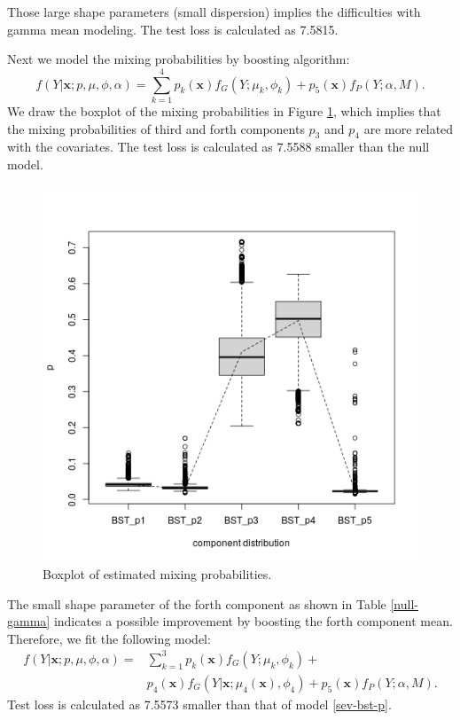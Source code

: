 \documentclass[11pt]{article}
\numberwithin{equation}{section}
\def\bx{\boldsymbol{x}}
\begin{document}
	Those large shape parameters (small dispersion) implies the  difficulties with {gamma mean modeling}. The test loss is calculated as 7.5815.

Next we model the mixing probabilities by boosting algorithm:
\begin{equation}\label{sev-bst-p}
f(Y|\bx;p,\mu,\phi,\alpha)=\sum_{k=1}^4p_k(\bx)f_{G}(Y;\mu_k,\phi_k)+p_5(\bx)f_{P}(Y;\alpha,M).
\end{equation}
We draw the boxplot of the mixing probabilities in Figure \ref{bx-bst-p}, which implies that the mixing probabilities of third and forth components $p_3$ and $p_4$ are more related with the covariates.
The test loss is calculated as 7.5588 smaller than the null model.
	\begin{figure}[htp!]
		\centering
		\includegraphics[width=0.35\linewidth]{../plots/sev/bst_p}
		\caption{Boxplot of estimated mixing probabilities.}\label{bx-bst-p}
	\end{figure}


The small shape parameter of the forth component as shown in Table \ref{null-gamma} indicates a possible improvement by boosting the forth component  mean.
Therefore, we fit the following model:
	$$
	\begin{aligned}
		f(Y|\bx;p,\mu,\phi,\alpha)=&\sum_{k=1}^3p_k(\bx)f_{G}(Y;\mu_k,\phi_k)+ \\
		&p_4(\bx)f_{G}(Y|\bx;\mu_4(\bx),\phi_4)+ p_5(\bx)f_{P}(Y;\alpha,M).
	\end{aligned}
	$$
	Test loss is calculated as 7.5573 smaller than that of model \eqref{sev-bst-p}. 
\end{document}
